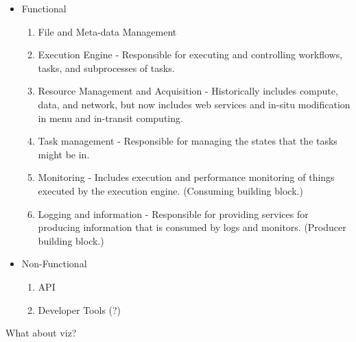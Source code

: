 \begin{itemize}
\item Functional
\begin{enumerate}
\item File and Meta-data Management
\item Execution Engine - Responsible for executing and controlling workflows, tasks, and subprocesses of tasks.
\item Resource Management and Acquisition - Historically includes compute, data, and network, but now includes web services and in-situ modification in menu and in-transit computing.
\item Task management - Responsible for managing the states that the tasks might be in.
\item Monitoring - Includes execution and performance monitoring of things executed by the execution engine. (Consuming building block.)
\item Logging and information - Responsible for providing services for producing information that is consumed by logs and monitors. (Producer building block.)
\end{enumerate}
\item Non-Functional
\begin{enumerate}
\item API 
\item Developer Tools (?)
\end{enumerate}
\end{itemize}

What about viz?

